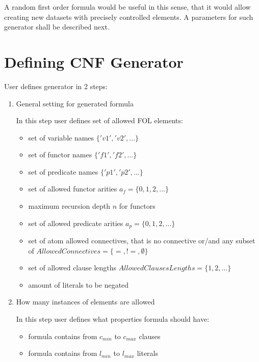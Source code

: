 A random first order formula would be useful in this sense, that it would allow creating new datasets with precisely controlled elements. A parameters for such generator shall be described next.

\newpage

\section{Defining CNF Generator}

User defines generator in 2 steps:

\begin{enumerate}
  \item General setting for generated formula

    In this step user defines set of allowed \gls{FOL} elements:
    \begin{itemize}
      \item set of variable names $\{'v1','v2',\dots\}$
      \item set of functor names $\{'f1','f2',\dots\}$
      \item set of predicate names $\{'p1','p2',\dots\}$
      \item set of allowed functor arities $a_f = \{0, 1, 2,\dots\}$
      \item maximum recursion depth $n$ for functors
      \item set of allowed predicate arities $a_p = \{0, 1, 2,\dots\}$
      \item set of atom allowed connectives, that is no connective or/and any subset of $AllowedConnectives = \{=, !=, \emptyset\}$
      \item set of allowed clause lengths $AllowedClausesLengths = \{1,2,\dots\}$
      \item amount of literals to be negated
    \end{itemize}

  \item How many instances of elements are allowed

    In this step user defines what properties formula should have:
    \begin{itemize}
      \item formula contains from $c_{min}$ to $c_{max}$ clauses
      \item formula contains from $l_{min}$ to $l_{max}$ literals
    \end{itemize}
\end{enumerate}

